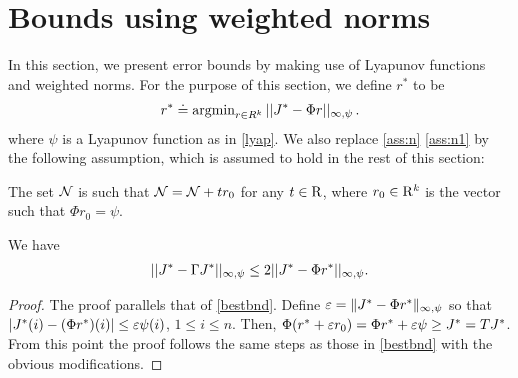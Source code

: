 \section{Bounds using weighted norms}\label{sec:improv}
In this section, we present error bounds by making use of Lyapunov functions and weighted norms.
For the purpose of this section, we define $r^*$ to be 
\begin{align*}
r^*\doteq\operatorname{argmin}_{r\in R^k}||J^*-\Phi r||_{\infty,\psi}\,.
\end{align*}
where $\psi$ is a Lyapunov function as in \cref{lyap}.
We also replace \cref{ass:n} \eqref{ass:n1} by the following assumption,
which is assumed to hold in the rest of this section:
\begin{assumption}\label{ass:n4}
The set $\mathcal{N}$ is such that $\mathcal{N} = \mathcal{N} + t r_0$ for any $t\in \mathrm{R}$, where $r_0\in \mathrm{R}^k$ 
is the vector such that $\Phi r_0 = \psi$.
\end{assumption}
\begin{lemma}\label{bestbndmn}
We have
\begin{align}
||J^*-\Gamma J^*||_{\infty,\psi}\leq 2||J^*-\Phi r^*||_{\infty,\psi}.
\end{align}
\end{lemma}
\begin{proof}
The proof parallels that of \cref{bestbnd}.
Define $\varepsilon = \|J^* - \Phi r^*\|_{\infty,\psi}$ so that
$|J^*(i) - (\Phi r^*)(i) | \le \varepsilon \psi (i)$, $1 \le i \le n$.
Then, $\Phi( r^* + \varepsilon r_0 ) = \Phi r^* + \varepsilon \psi \ge J^* = T J^*$.
From this point the proof follows the same steps as those in \cref{bestbnd}
with the obvious modifications.
\end{proof}


